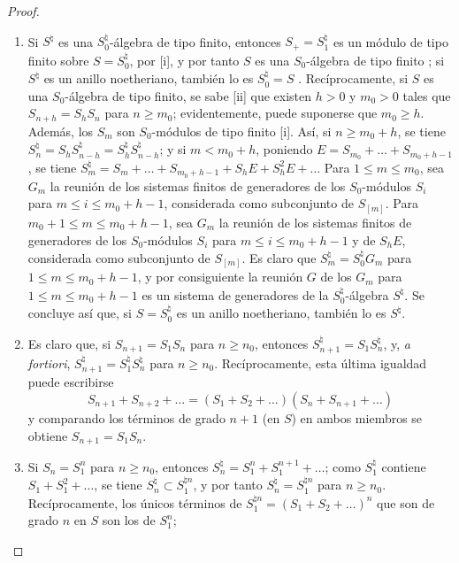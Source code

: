 \documentclass[oneside,10pt]{amsart}
\renewcommand{\leq}{\leqslant}
\renewcommand{\geq}{\geqslant}
\newcommand{\oldpage}[2][]{\marginnote{\normalfont\footnotesize\textbf{#1}~|~#2}\ignorespaces}
\begin{document}
\begin{proof}
\medskip\noindent
\begin{enumerate}
  \item[\rm{(i)}] Si $S^\natural$ es una $S_0^\natural$-álgebra de tipo finito, entonces $S_+=S_1^\natural$ es un módulo de tipo finito sobre $S=S_0^\natural$, por [i], y por tanto $S$ es una $S_0$-álgebra de tipo finito ;
    si $S^\natural$ es un anillo noetheriano, también lo es $S_0^\natural=S$ .
    Recíprocamente, si $S$ es una $S_0$-álgebra
\oldpage[II]{160}
    de tipo finito, se sabe [ii] que existen $h>0$ y $m_0>0$ tales que $S_{n+h}=S_hS_n$ para $n\geq m_0$;
    evidentemente, puede suponerse que $m_0\geq h$.
    Además, los $S_m$ son $S_0$-módulos de tipo finito [i].
    Así, si $n\geq m_0+h$, se tiene $S_n^\natural=S_hS_{n-h}^\natural
=S_h^\natural S_{n-h}^\natural$;
    y si $m<m_0+h$, poniendo $E=S_{m_0}+\ldots+S_{m_0+h-1}$, se tiene
    $S_m^\natural=S_m+\ldots+S_{m_0+h-1}+S_hE+S_h^2E+\ldots$
    Para $1\leq m\leq m_0$, sea $G_m$ la reunión de los sistemas finitos de generadores de los $S_0$-módulos $S_i$ para $m\leq i\leq m_0+h-1$, considerada como subconjunto de $S_{[m]}$.
    Para $m_0+1\leq m\leq m_0+h-1$, sea $G_m$ la reunión de los sistemas finitos de generadores de los $S_0$-módulos $S_i$ para $m\leq i\leq m_0+h-1$ y de $S_hE$, considerada como subconjunto de $S_{[m]}$.
    Es claro que $S_m^\natural=S_0^\natural G_m$ para $1\leq m\leq m_0+h-1$, y por consiguiente la reunión $G$ de los $G_m$ para $1\leq m\leq m_0+h-1$ es un sistema de generadores de la $S_0^\natural$-álgebra $S^\natural$.
    Se concluye así que, si $S=S_0^\natural$ es un anillo noetheriano, también lo es $S^\natural$.
  \item[\rm{(ii)}] Es claro que, si $S_{n+1}=S_1S_n$ para $n\geq n_0$, entonces $S_{n+1}^\natural=S_1S_n^\natural$, y, \emph{a fortiori}, $S_{n+1}^\natural=S_1^\natural S_n^\natural$ para $n\geq n_0$.
    Recíprocamente, esta última igualdad puede escribirse
    \[
  S_{n+1}+S_{n+2}+\ldots=(S_1+S_2+\ldots)(S_n+S_{n+1}+\ldots)
\]
    y comparando los términos de grado $n+1$ (en $S$) en ambos miembros se obtiene $S_{n+1}=S_1S_n$.
  \item[\rm{(iii)}] Si $S_n=S_1^n$ para $n\geq n_0$, entonces $S_n^\natural=S_1^n+S_1^{n+1}+\ldots$;
    como $S_1^\natural$ contiene $S_1+S_1^2+\ldots$, se tiene $S_n^\natural\subset S_1^{\natural n}$, y por tanto $S_n^\natural=S_1^{\natural n}$ para $n\geq n_0$.
    Recíprocamente, los únicos términos de $S_1^{\natural n}=(S_1+S_2+\ldots)^n$ que son de grado $n$ en $S$ son los de $S_1^n$;

\end{enumerate}
\end{proof}
\end{document}
